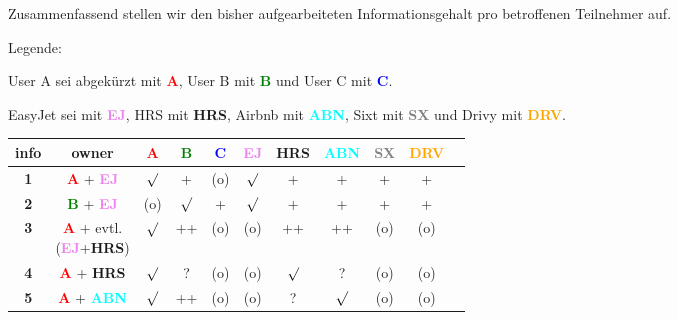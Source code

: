 \begin{Example}
Zusammenfassend stellen wir den bisher aufgearbeiteten Informationsgehalt pro betroffenen Teilnehmer auf.

\vspace{0.1cm}

Legende: 

User A sei abgekürzt mit \textcolor{red}{\textbf{A}}, User B mit \textcolor{green}{\textbf{B}} und User C mit \textcolor{blue}{\textbf{C}}.

EasyJet sei mit \textcolor{violet}{\textbf{EJ}}, HRS mit \textcolor{dunkelgruen}{\textbf{HRS}}, Airbnb mit \textcolor{cyan}{\textbf{ABN}}, Sixt mit \textcolor{gray}{\textbf{SX}} und Drivy mit \textcolor{orange}{\textbf{DRV}}.

\vspace{0.2cm}

\begin{tabular}[h]{|c|c|c|c|c|c|c|c|c|c|c}
\hline
\textbf{info} & \textbf{owner} & \textcolor{red}{\textbf{A}} & \textcolor{green}{\textbf{B}} & \textcolor{blue}{\textbf{C}} & \textcolor{violet}{\textbf{EJ}} & \textcolor{dunkelgruen}{\textbf{HRS}} & \textcolor{cyan}{\textbf{ABN}} & \textcolor{gray}{\textbf{SX}} & \textcolor{orange}{\textbf{DRV}} \\
\hline
\textbf{1} & \textcolor{red}{\textbf{A}} + \textcolor{violet}{\textbf{EJ}} & $\surd$ & \textcolor{dunkelgruen}{+} & (o) & $\surd$ & \textcolor{dunkelgruen}{+} & \textcolor{dunkelgruen}{+} & \textcolor{dunkelgruen}{+} & \textcolor{dunkelgruen}{+} \\
\hline
\textbf{2} & \textcolor{green}{\textbf{B}} + \textcolor{violet}{\textbf{EJ}} & (o) & $\surd$ & \textcolor{dunkelgruen}{+} & $\surd$ & \textcolor{dunkelgruen}{+} & \textcolor{dunkelgruen}{+} & \textcolor{dunkelgruen}{+} & \textcolor{dunkelgruen}{+} \\
\hline
\textbf{3} & \parbox{1.8cm}{\textcolor{red}{\textbf{A}} + evtl. \\ (\textcolor{violet}{\textbf{EJ}}+\textcolor{dunkelgruen}{\textbf{HRS}})} & $\surd$ & \textcolor{dunkelgruen}{++} & (o) & (o) & \textcolor{dunkelgruen}{++} & \textcolor{dunkelgruen}{++} & (o) & (o) \\
\hline
\textbf{4} & \textcolor{red}{\textbf{A}} + \textcolor{dunkelgruen}{\textbf{HRS}} & $\surd$ & ? & (o) & (o) & $\surd$ & ? & (o) & (o) \\
\hline
\textbf{5} & \textcolor{red}{\textbf{A}} + \textcolor{cyan}{\textbf{ABN}} & $\surd$ & \textcolor{dunkelgruen}{++} & (o) & (o) & ? & $\surd$ & (o) & (o) \\

\end{tabular}
\end{Example}
